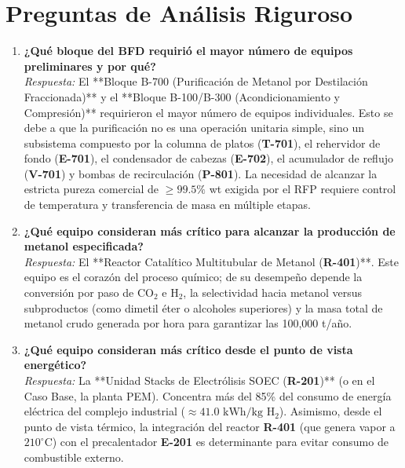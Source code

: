\documentclass[11pt,letterpaper]{article}
\newcommand{\tagbox}[1]{\textbf{\color{SolvantaNavy}#1}}
\begin{document}
\section{Preguntas de Análisis Riguroso}

\begin{enumerate}[label=\textbf{\arabic*.}]
    \item \textbf{¿Qué bloque del BFD requirió el mayor número de equipos preliminares y por qué?}\\[0.1cm]
    \textit{Respuesta:} El **Bloque B-700 (Purificación de Metanol por Destilación Fraccionada)** y el **Bloque B-100/B-300 (Acondicionamiento y Compresión)** requirieron el mayor número de equipos individuales. Esto se debe a que la purificación no es una operación unitaria simple, sino un subsistema compuesto por la columna de platos (\tagbox{T-701}), el rehervidor de fondo (\tagbox{E-701}), el condensador de cabezas (\tagbox{E-702}), el acumulador de reflujo (\tagbox{V-701}) y bombas de recirculación (\tagbox{P-801}). La necesidad de alcanzar la estricta pureza comercial de $\ge 99.5\%$ wt exigida por el RFP requiere control de temperatura y transferencia de masa en múltiple etapas.

    \item \textbf{¿Qué equipo consideran más crítico para alcanzar la producción de metanol especificada?}\\[0.1cm]
    \textit{Respuesta:} El **Reactor Catalítico Multitubular de Metanol (\tagbox{R-401})**. Este equipo es el corazón del proceso químico; de su desempeño depende la conversión por paso de $\text{CO}_2$ e $\text{H}_2$, la selectividad hacia metanol versus subproductos (como dimetil éter o alcoholes superiores) y la masa total de metanol crudo generada por hora para garantizar las 100,000 t/año.

    \item \textbf{¿Qué equipo consideran más crítico desde el punto de vista energético?}\\[0.1cm]
    \textit{Respuesta:} La **Unidad Stacks de Electrólisis SOEC (\tagbox{R-201})** (o en el Caso Base, la planta PEM). Concentra más del 85\% del consumo de energía eléctrica del complejo industrial ($\approx 41.0\text{ kWh/kg }\text{H}_2$). Asimismo, desde el punto de vista térmico, la integración del reactor \tagbox{R-401} (que genera vapor a $210^\circ\text{C}$) con el precalentador \tagbox{E-201} es determinante para evitar consumo de combustible externo.


\end{enumerate}
\end{document}
